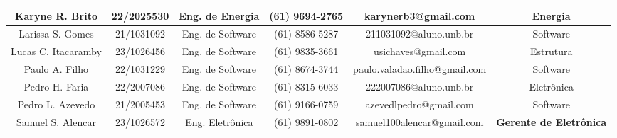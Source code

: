 \begin{landscape}
\begin{table}[htpb]
\begin{center}
\begin{tabular}{|c|c|c|c|c|c|}
Karyne R. Brito & 22/2025530 & Eng. de Energia & (61) 9694-2765 & karynerb3@gmail.com & Energia \\ \hline
Larissa S. Gomes & 21/1031092 & Eng. de Software & (61) 8586-5287 & 211031092@aluno.unb.br & Software \\ \hline
Lucas C. Itacaramby & 23/1026456 & Eng. de Software & (61) 9835-3661 & usichaves@gmail.com & Estrutura \\ \hline
Paulo A. Filho & 22/1031229 & Eng. de Software & (61) 8674-3744 & paulo.valadao.filho@gmail.com & Software \\ \hline
Pedro H. Faria & 22/2007086 & Eng. de Software & (61) 8315-6033 & 222007086@aluno.unb.br & Eletrônica \\ \hline
Pedro L. Azevedo & 21/2005453 & Eng. de Software & (61) 9166-0759 & azevedlpedro@gmail.com & Software \\ \hline
Samuel S. Alencar & 23/1026572 & Eng. Eletrônica & (61) 9891-0802 & samuel100alencar@gmail.com & \textbf{Gerente de Eletrônica} \\ \hline
\end{tabular}
\end{center}
\end{table}


\end{landscape}
